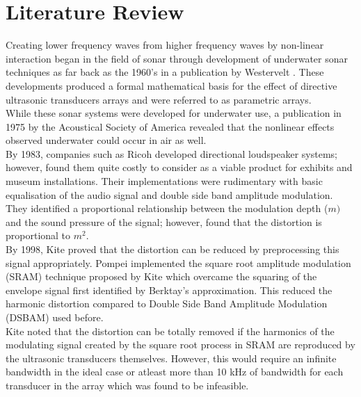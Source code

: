 \section{Literature Review}
Creating lower frequency waves from higher frequency waves by non-linear interaction began in the field of sonar through development of underwater sonar techniques as far back as the 1960's in a publication by Westervelt \cite{westervelt_1963}. These developments produced a formal mathematical basis for the effect of directive ultrasonic transducers arrays and were referred to as parametric arrays.\\
While these sonar systems were developed for underwater use, a publication in 1975 by the Acoustical Society of America \cite{bennett_blackstock_1975} revealed that the nonlinear effects observed underwater could occur in air as well.\\
By 1983, companies such as Ricoh \cite{yoneyama_fujimoto_kawamo_sasabe_1983} developed directional loudspeaker systems; however, found them quite costly to consider as a viable product for exhibits and museum installations. Their implementations were rudimentary with basic equalisation of the audio signal and double side band amplitude modulation. They identified a proportional relationship between the modulation depth ($m)$ and the sound pressure of the signal; however, found that the distortion is proportional to $m^2$.\\
By 1998, Kite \cite{kite_post_hamilton_1998} proved that the distortion can be reduced by preprocessing this signal appropriately. Pompei \cite{pompei2002sound} implemented the square root amplitude modulation (SRAM) technique proposed by Kite which overcame the squaring of the envelope signal first identified by Berktay's approximation. This reduced the harmonic distortion compared to Double Side Band Amplitude Modulation (DSBAM) used before.\\
Kite \cite{kite_post_hamilton_1998} noted that the distortion can be totally removed if the harmonics of the modulating signal created by the square root process in SRAM are reproduced by the ultrasonic transducers themselves. However, this would require an infinite bandwidth in the ideal case or atleast more than 10 kHz of bandwidth for each transducer in the array which was found to be infeasible.\\
